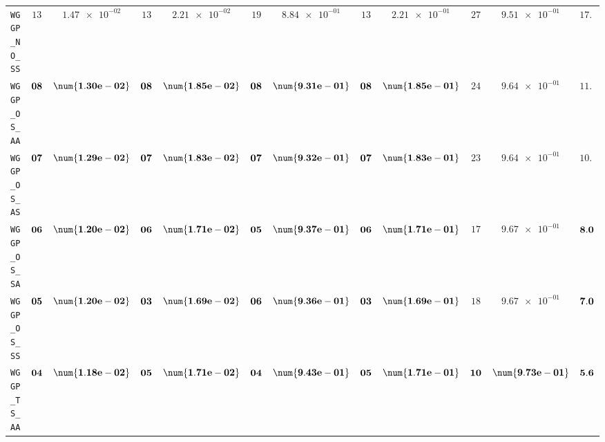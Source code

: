 \begin{xltabular}{\textwidth}{l||cC|cC|cC|cC|cC||c}
	\texttt{WGGP\_NO\_SS} & $ 13$ & $ \num{1.47e-02}$ & $ 13$ & $ \num{2.21e-02}$ & $ 19$ & $ \num{8.84e-01}$ & $ 13$ & $ \num{2.21e-01}$ & $ 27$ & $ \num{9.51e-01}$ & $ 17.0$  \\
	\texttt{WGGP\_OS\_AA} & $\bf 08$ & $\bf \num{1.30e-02}$ & $\bf 08$ & $\bf \num{1.85e-02}$ & $\bf 08$ & $\bf \num{9.31e-01}$ & $\bf 08$ & $\bf \num{1.85e-01}$ & $ 24$ & $ \num{9.64e-01}$ & $ 11.2$  \\
	\texttt{WGGP\_OS\_AS} & $\bf 07$ & $\bf \num{1.29e-02}$ & $\bf 07$ & $\bf \num{1.83e-02}$ & $\bf 07$ & $\bf \num{9.32e-01}$ & $\bf 07$ & $\bf \num{1.83e-01}$ & $ 23$ & $ \num{9.64e-01}$ & $ 10.2$  \\
	\texttt{WGGP\_OS\_SA} & $\bf 06$ & $\bf \num{1.20e-02}$ & $\bf 06$ & $\bf \num{1.71e-02}$ & $\bf 05$ & $\bf \num{9.37e-01}$ & $\bf 06$ & $\bf \num{1.71e-01}$ & $ 17$ & $ \num{9.67e-01}$ & $\bf 8.0$  \\
	\texttt{WGGP\_OS\_SS} & $\bf 05$ & $\bf \num{1.20e-02}$ & $\bf 03$ & $\bf \num{1.69e-02}$ & $\bf 06$ & $\bf \num{9.36e-01}$ & $\bf 03$ & $\bf \num{1.69e-01}$ & $ 18$ & $ \num{9.67e-01}$ & $\bf 7.0$  \\
	\texttt{WGGP\_TS\_AA} & $\bf 04$ & $\bf \num{1.18e-02}$ & $\bf 05$ & $\bf \num{1.71e-02}$ & $\bf 04$ & $\bf \num{9.43e-01}$ & $\bf 05$ & $\bf \num{1.71e-01}$ & $\bf 10$ & $\bf \num{9.73e-01}$ & $\bf 5.6$  \\

\end{xltabular}
